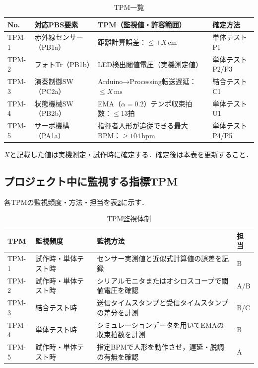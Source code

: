 \begin{table}[H]
  \centering
  \begin{tabularx}{\linewidth}{llXl}
    \toprule
    No. & 対応PBS要素 & TPM（監視値・許容範囲） & 確定方法 \\
    \midrule
    TPM-1 & 赤外線センサー（PB1a） &
      距離計算誤差：$\leq \pm X\,\mathrm{cm}$ & 単体テストP1 \\
    TPM-2 & フォトTr（PB1b） &
      LED検出閾値電圧（実機測定値） & 単体テストP2/P3 \\
    TPM-3 & 演奏制御SW（PC2a） &
      Arduino→Processing転送遅延：$\leq X\,\mathrm{ms}$ & 結合テストC1 \\
    TPM-4 & 状態機械SW（PB2b） &
      EMA（$\alpha=0.2$）テンポ収束拍数：$\leq 13$拍 & 単体テストU1 \\
    TPM-5 & サーボ機構（PA1a） &
      指揮者人形が追従できる最大BPM：$\geq 104\,\mathrm{bpm}$ & 単体テストP4/P5 \\
    \bottomrule
  \end{tabularx}
  \caption{TPM一覧}
  \label{tab:tpm}
\end{table}

\noindent
$X$と記載した値は実機測定・試作時に確定する．確定後は本表を更新すること．

\subsection{プロジェクト中に監視する指標TPM}

各TPMの監視頻度・方法・担当を表\ref{tab:tpm-monitor}に示す．

\begin{table}[H]
  \centering
  \begin{tabularx}{\linewidth}{llXl}
    \toprule
    TPM & 監視頻度 & 監視方法 & 担当 \\
    \midrule
    TPM-1 & 試作時・単体テスト時 &
      センサー実測値と近似式計算値の誤差を記録 & B \\
    TPM-2 & 試作時・単体テスト時 &
      シリアルモニタまたはオシロスコープで閾値電圧を確認 & A/B \\
    TPM-3 & 結合テスト時 &
      送信タイムスタンプと受信タイムスタンプの差分を計測 & B/C \\
    TPM-4 & 単体テスト時 &
      シミュレーションデータを用いてEMAの収束拍数を計測 & B \\
    TPM-5 & 試作時・単体テスト時 &
      指定BPMで人形を動作させ，遅延・脱調の有無を確認 & A \\
    \bottomrule
  \end{tabularx}
  \caption{TPM監視体制}
  \label{tab:tpm-monitor}
\end{table}

